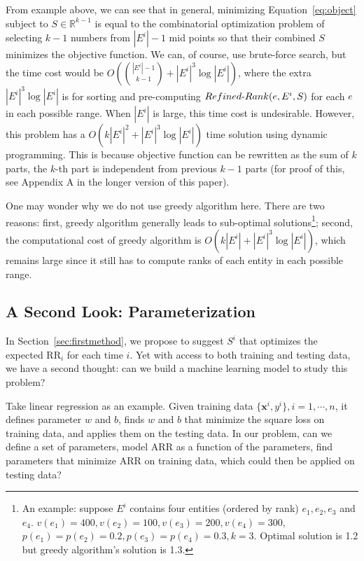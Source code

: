 From example above, we can see that in general, minimizing Equation~\ref{eq:object} subject to $S\in \mathbb{R}^{k-1}$ is equal to the combinatorial optimization problem of selecting $k-1$ numbers from $|E^i| - 1$ mid points so that their combined $S$ minimizes the objective function. We can, of course, use brute-force search, but the time cost would be $O({|E^i| - 1 \choose{k-1}} \allowbreak+ |E^i|^3\log{|E^i|})$, where the extra $|E^i|^3\log{|E^i|}$ is for sorting and pre-computing $\mathop{\mbox{$Refined$-$Rank$}}(e, E^i, S)$ for each $e$ in each possible range. When $|E^i|$ is large, this time cost is undesirable. However, this problem has a $O(k|E^i|^2 + |E^i|^3\log{|E^i|})$ time solution using dynamic programming. This is because objective function can be rewritten as the sum of $k$ parts, the $k$-th part is independent from previous $k-1$ parts (for proof of this, see Appendix A in the longer version of this paper).

One may wonder why we do not use greedy algorithm here. There are two reasons: first, greedy algorithm generally leads to sub-optimal solutions\footnote{An example: suppose $E^i$ contains four entities (ordered by rank) $e_1, e_2, e_3$ and $e_4$. $v(e_1)=400, v(e_2)=100, v(e_3)=200, v(e_4)=300$, $p(e_1)=p(e_2)=0.2,p(e_3)=p(e_4)=0.3, k=3$. Optimal solution is 1.2 but greedy algorithm's solution is 1.3.}; second, the computational cost of greedy algorithm is $O(k|E^i| + |E^i|^3\log{|E^i|})$, which remains large since it still has to compute ranks of each entity in each possible range. 

\subsection{A Second Look: Parameterization}
\label{ch2:percentage}

In Section~\ref{sec:firstmethod}, we propose to suggest $S^i$ that optimizes the expected RR$_i$ for each time $i$. Yet with access to both training and testing data, we have a second thought: can we build a machine learning model to study this problem? 

Take linear regression as an example. Given training data $\{\mathbf{x}^i, y^i\}, i=1,\cdots, n$, it defines parameter $w$ and $b$, finds $w$ and $b$ that minimize the square loss on training data, and applies them on the testing data. In our problem, can we define a set of parameters, model ARR as a function of the parameters, find parameters that minimize ARR on training data, which could then be applied on testing data?


